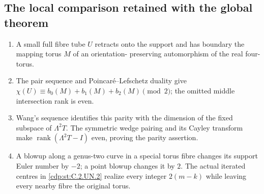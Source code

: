 \subsection*{The local comparison retained with the global theorem}
\RungOne
\begin{enumerate}[label=\arabic*.,leftmargin=*]
\item A small full fibre tube $U$ retracts onto the support
and has boundary the mapping torus $M$ of an orientation-
preserving automorphism of the real four-torus.
\item The pair sequence and Poincar\'e--Lefschetz duality
give $\chi(U)\equiv b_0(M)+b_1(M)+b_2(M)\pmod2$;
the omitted middle intersection rank is even.
\item Wang's sequence identifies this parity with the
dimension of the fixed subspace of $\Lambda^2T$.
The symmetric wedge pairing and its Cayley transform
make $\operatorname{rank}(\Lambda^2T-I)$ even, proving
the parity assertion.
\item A blowup along a genus-two curve in a special
torus fibre changes its support Euler number by $-2$;
a point blowup changes it by $2$.  The actual iterated
centres in \ref{cdp:st:C.2.UN.2} realize every integer
$2(m-k)$ while leaving every nearby fibre the original
torus.
\end{enumerate}
